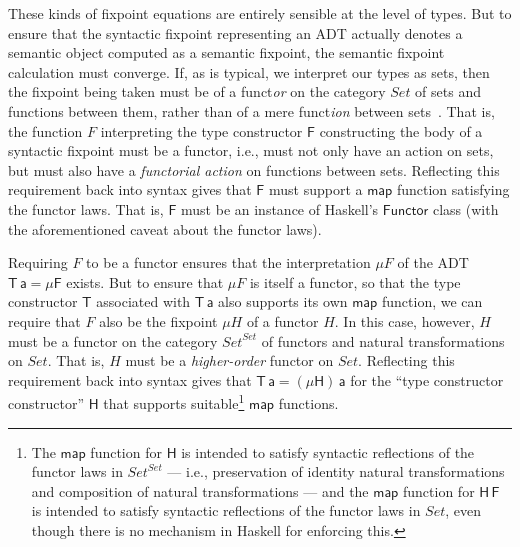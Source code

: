 \documentclass[submission,copyright,creativecommons]{eptcs}
\begin{document}
These kinds of fixpoint equations are entirely sensible at the level
of types. But to ensure that the syntactic fixpoint representing an
ADT actually denotes a semantic object computed as a semantic
fixpoint, the semantic fixpoint calculation must converge.  If, as is
typical, we interpret our types as sets, then the fixpoint being taken
must be of a funct{\em or} on the category $\mathit{Set}$ of sets and
functions between them, rather than of a mere funct{\em ion} between
sets~\cite{tfca}.  That is, the function $F$ interpreting the type
constructor $\mathsf{F}$ constructing the body of a syntactic fixpoint
must be a functor, i.e., must not only have an action on sets, but
must also have a {\em functorial action} on functions between
sets. Reflecting this requirement back into syntax gives that
$\mathsf{F}$ must support a
$\mathsf{map}$ function satisfying the functor laws. That is,
$\mathsf{F}$ must be an instance of Haskell's $\mathsf{Functor}$ class
(with the aforementioned caveat about the functor laws).

Requiring $F$ to be a functor ensures that the interpretation $\mu F$
of the ADT $\mathsf{T\,a} = \mathsf{\mu F}$ exists. But to ensure that
$\mu F$ is itself a functor, so that the type constructor $\mathsf{T}$
associated with $\mathsf{T\,a}$ also supports its own $\mathsf{map}$
function, we can require that $F$ also be the fixpoint $\mu H$ of a
functor $H$. In this case, however, $H$ must be a functor on the
category $\mathit{Set}^\mathit{Set}$ of functors and natural
transformations on $\mathit{Set}$. That is, $H$ must be a {\em
  higher-order} functor on $\mathit{Set}$. Reflecting this requirement
back into syntax gives that $\mathsf{T\,a} = \mathsf{(\mu H)\,a}$ for
the ``type constructor constructor'' $\mathsf{H}$ that supports
suitable\footnote{The $\mathsf{map}$ function for $\mathsf{H}$ is
  intended to satisfy syntactic reflections of the functor laws in
  $\mathit{Set}^\mathit{Set}$ --- i.e., preservation of identity
  natural transformations and composition of natural transformations
  --- and the $\mathsf{map}$ function for $\mathsf{H\,F}$ is intended
  to satisfy syntactic reflections of the functor laws in
  $\mathit{Set}$, even though there is no mechanism in Haskell for
  enforcing this.} $\mathsf{map}$ functions.
\end{document}
